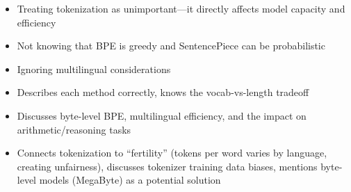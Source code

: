 \begin{interviewq}
\redflags
\begin{itemize}
    \item Treating tokenization as unimportant---it directly affects model capacity and efficiency
    \item Not knowing that BPE is greedy and SentencePiece can be probabilistic
    \item Ignoring multilingual considerations
\end{itemize}


\goodgreat
\begin{itemize}
    \item {} Describes each method correctly, knows the vocab-vs-length tradeoff
    \item {} Discusses byte-level BPE, multilingual efficiency, and the impact on arithmetic/reasoning tasks
    \item {} Connects tokenization to ``fertility'' (tokens per word varies by language, creating unfairness), discusses tokenizer training data biases, mentions byte-level models (MegaByte) as a potential solution
\end{itemize}

\end{interviewq}

